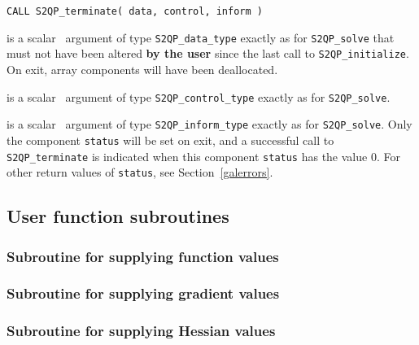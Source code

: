 \documentclass{galahad}
\newcommand{\packagename}{S2QP}
\begin{document}
\hspace{8mm}
{\tt CALL \packagename\_terminate( data, control, inform )}

\vspace*{-3mm}
\begin{description}

 is a scalar \intentinout\ argument of type 
{\tt \packagename\_data\_type} 
exactly as for
{\tt \packagename\_solve}
that must not have been altered {\bf by the user} since the last call to 
{\tt \packagename\_initialize}.
On exit, array components will have been deallocated.

 is a scalar \intentin\ argument of type 
{\tt \packagename\_control\_type}
exactly as for
{\tt \packagename\_solve}.

 is a scalar \intentout\ argument of type 
{\tt \packagename\_inform\_type}
exactly as for
{\tt \packagename\_solve}.
Only the component {\tt status} will be set on exit, and a 
successful call to 
{\tt \packagename\_terminate}
is indicated when this  component {\tt status} has the value 0. 
For other return values of {\tt status}, see Section~\ref{galerrors}.

\end{description}


\subsection{User function subroutines}\label{functions}



\subsubsection{Subroutine for supplying function values}\label{FC}


\subsubsection{Subroutine for supplying gradient values}\label{GJ}


\subsubsection{Subroutine for supplying Hessian values}\label{H}
\end{document}
